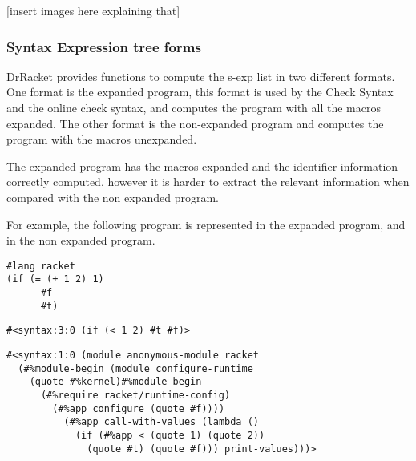 [insert images here explaining that]


\subsubsection{Syntax Expression tree forms}
DrRacket provides functions to compute the s-exp list in two different formats.
One format is the expanded program, this format is used by the Check Syntax and
the online check syntax, and computes the program with all the macros expanded. %
The other format is the non-expanded program and computes the program with the macros
unexpanded.

The expanded program has the macros expanded and the identifier information correctly
computed, however it is harder to extract the relevant information when compared with the
non expanded program.

For example, the following program is represented in the expanded program,
and in the non expanded program. %
\begin{lstlisting}[basicstyle=\ttfamily, caption="example"]
#lang racket
(if (= (+ 1 2) 1)
      #f
      #t)
\end{lstlisting}

\begin{lstlisting}[basicstyle=\ttfamily, caption="Syntax from Example"]
#<syntax:3:0 (if (< 1 2) #t #f)>
\end{lstlisting} %

\begin{lstlisting}[basicstyle=\ttfamily, caption="Expanded Syntax from example"]
#<syntax:1:0 (module anonymous-module racket
  (#%module-begin (module configure-runtime
    (quote #%kernel)#%module-begin
      (#%require racket/runtime-config)
        (#%app configure (quote #f))))
          (#%app call-with-values (lambda ()
            (if (#%app < (quote 1) (quote 2))
              (quote #t) (quote #f))) print-values)))>
\end{lstlisting}




